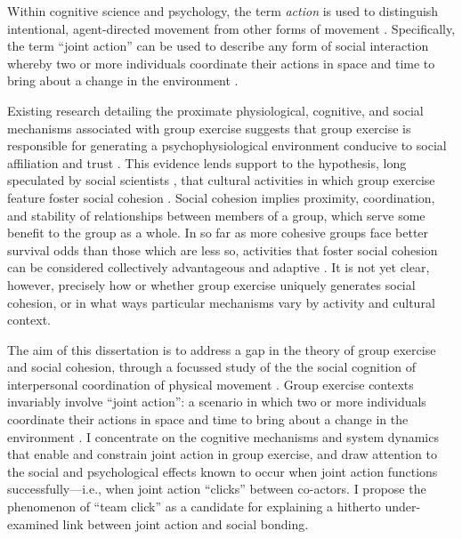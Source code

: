 \begin{CJK}{UTF8}{gbsn}
Within cognitive science and psychology, the term \textit{action} is used to distinguish intentional, agent-directed movement from other forms of movement \citep{Davidson1980}.  Specifically, the term ``joint action'' can be used to describe any form of social interaction whereby two or more individuals coordinate their actions in space and time to bring about a change in the environment \citep{Sebanz2006}.



  Existing research detailing the proximate physiological, cognitive, and social mechanisms associated with group exercise suggests that group exercise is responsible for generating a psychophysiological environment conducive to social affiliation and trust \citep{Davis2015}.  This evidence lends support to the hypothesis, long speculated by social scientists \citep[see, for example][]{Durkheim1965}, that cultural activities in which group exercise feature foster social cohesion \citep{Dunbar2010,Whitehouse2004}.  Social cohesion implies proximity, coordination, and stability of relationships between members of a group, which serve some benefit to the group as a whole.  In so far as more cohesive groups face better survival odds than those which are less so, activities that foster social cohesion can be considered collectively advantageous and adaptive \citep{Dunbar2010}.  It is not yet clear, however, precisely how or whether group exercise uniquely generates social cohesion, or in what ways particular mechanisms vary by activity and cultural context.

The aim of this dissertation is to address a gap in the theory of group exercise and social cohesion, through a focussed study of the the social cognition of interpersonal coordination of physical movement \citep{Marsh2009}.  Group exercise contexts invariably involve ``joint action'': a scenario in which two or more individuals coordinate their actions in space and time to bring about a change in the environment \citep{Sebanz2006}.  I concentrate on the cognitive mechanisms and system dynamics that enable and constrain joint action in group exercise, and draw attention to the social and psychological effects known to occur when joint action functions successfully---i.e., when joint action ``clicks'' between co-actors.  I propose the phenomenon of ``team click'' as a candidate for explaining a hitherto under-examined link between joint action and social bonding.


\end{CJK}
